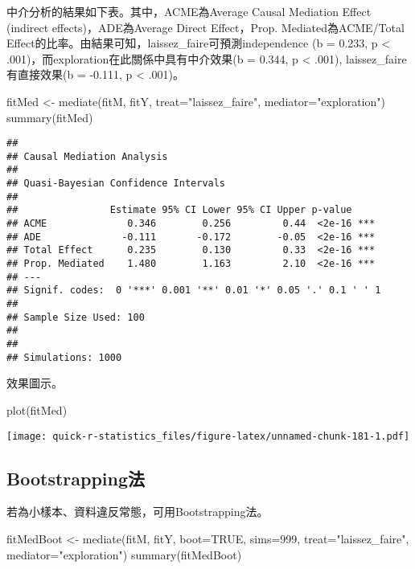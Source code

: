 \documentclass[
]{book}
\newenvironment{Shaded}{\begin{snugshade}}{\end{snugshade}}
\newcommand{\AttributeTok}[1]{\textcolor[rgb]{0.77,0.63,0.00}{#1}}
\newcommand{\ConstantTok}[1]{\textcolor[rgb]{0.00,0.00,0.00}{#1}}
\newcommand{\DecValTok}[1]{\textcolor[rgb]{0.00,0.00,0.81}{#1}}
\newcommand{\FunctionTok}[1]{\textcolor[rgb]{0.00,0.00,0.00}{#1}}
\newcommand{\NormalTok}[1]{#1}
\newcommand{\OtherTok}[1]{\textcolor[rgb]{0.56,0.35,0.01}{#1}}
\newcommand{\StringTok}[1]{\textcolor[rgb]{0.31,0.60,0.02}{#1}}
\begin{document}
中介分析的結果如下表。其中，ACME為Average Causal Mediation Effect (indirect effects)，ADE為Average Direct Effect，Prop. Mediated為ACME/Total Effect的比率。由結果可知，laissez\_faire可預測independence (b = 0.233, p \textless{} .001)，而exploration在此關係中具有中介效果(b = 0.344, p \textless{} .001), laissez\_faire有直接效果(b = -0.111, p \textless{} .001)。

\begin{Shaded}
\begin{Highlighting}[]
\NormalTok{fitMed }\OtherTok{\textless{}{-}} \FunctionTok{mediate}\NormalTok{(fitM, fitY, }\AttributeTok{treat=}\StringTok{"laissez\_faire"}\NormalTok{, }\AttributeTok{mediator=}\StringTok{"exploration"}\NormalTok{)}
\FunctionTok{summary}\NormalTok{(fitMed)}
\end{Highlighting}
\end{Shaded}

\begin{verbatim}
## 
## Causal Mediation Analysis 
## 
## Quasi-Bayesian Confidence Intervals
## 
##                Estimate 95% CI Lower 95% CI Upper p-value    
## ACME              0.346        0.256         0.44  <2e-16 ***
## ADE              -0.111       -0.172        -0.05  <2e-16 ***
## Total Effect      0.235        0.130         0.33  <2e-16 ***
## Prop. Mediated    1.480        1.163         2.10  <2e-16 ***
## ---
## Signif. codes:  0 '***' 0.001 '**' 0.01 '*' 0.05 '.' 0.1 ' ' 1
## 
## Sample Size Used: 100 
## 
## 
## Simulations: 1000
\end{verbatim}

效果圖示。

\begin{Shaded}
\begin{Highlighting}[]
\FunctionTok{plot}\NormalTok{(fitMed)}
\end{Highlighting}
\end{Shaded}

\texttt{[image: quick-r-statistics\_files/figure-latex/unnamed-chunk-181-1.pdf]}

\hypertarget{bootstrappingux6cd5}{%
\subsection{Bootstrapping法}\label{bootstrappingux6cd5}}

若為小樣本、資料違反常態，可用Bootstrapping法。

\begin{Shaded}
\begin{Highlighting}[]
\NormalTok{fitMedBoot }\OtherTok{\textless{}{-}} \FunctionTok{mediate}\NormalTok{(fitM, fitY, }\AttributeTok{boot=}\ConstantTok{TRUE}\NormalTok{, }\AttributeTok{sims=}\DecValTok{999}\NormalTok{, }\AttributeTok{treat=}\StringTok{"laissez\_faire"}\NormalTok{, }\AttributeTok{mediator=}\StringTok{"exploration"}\NormalTok{)}
\FunctionTok{summary}\NormalTok{(fitMedBoot)}
\end{Highlighting}
\end{Shaded}
\end{document}
